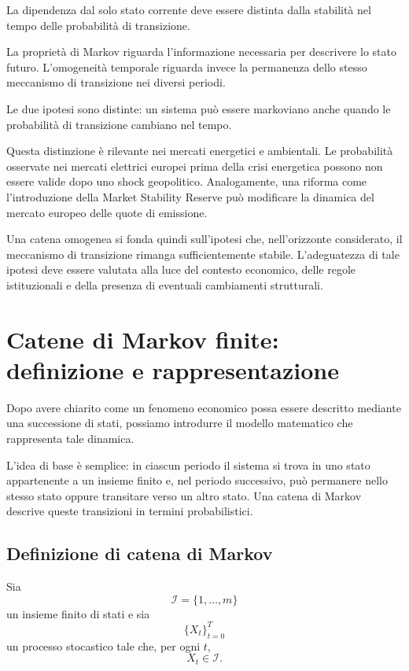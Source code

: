 La dipendenza dal solo stato corrente deve essere distinta dalla
stabilit\`{a} nel tempo delle probabilit\`{a} di transizione.

La propriet\`{a} di Markov riguarda l'informazione necessaria per
descrivere lo stato futuro. L'omogeneit\`{a} temporale riguarda invece
la permanenza dello stesso meccanismo di transizione nei diversi
periodi.

Le due ipotesi sono distinte: un sistema pu\`{o} essere markoviano anche
quando le probabilit\`{a} di transizione cambiano nel tempo.

Questa distinzione \`{e} rilevante nei mercati energetici e ambientali.
Le probabilit\`{a} osservate nei mercati elettrici europei prima della
crisi energetica possono non essere valide dopo uno shock geopolitico.
Analogamente, una riforma come l'introduzione della Market Stability
Reserve pu\`{o} modificare la dinamica del mercato europeo delle quote
di emissione.

Una catena omogenea si fonda quindi sull'ipotesi che, nell'orizzonte
considerato, il meccanismo di transizione rimanga sufficientemente
stabile. L'adeguatezza di tale ipotesi deve essere valutata alla luce
del contesto economico, delle regole istituzionali e della presenza di
eventuali cambiamenti strutturali.

\section{Catene di Markov finite: definizione e rappresentazione}

Dopo avere chiarito come un fenomeno economico possa essere descritto
mediante una successione di stati, possiamo introdurre il modello
matematico che rappresenta tale dinamica.

L'idea di base \`{e} semplice: in ciascun periodo il sistema si trova in
uno stato appartenente a un insieme finito e, nel periodo successivo,
pu\`{o} permanere nello stesso stato oppure transitare verso un altro
stato. Una catena di Markov descrive queste transizioni in termini
probabilistici.

\subsection{Definizione di catena di Markov}

Sia
\[
\mathcal{I}=\{1,\ldots,m\}
\]
un insieme finito di stati e sia
\[
\{X_t\}_{t=0}^{T}
\]
un processo stocastico tale che, per ogni \(t\),
\[
X_t\in\mathcal{I}.
\]

